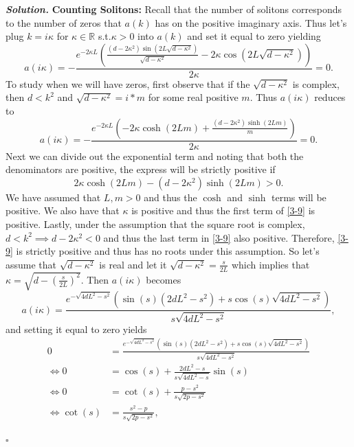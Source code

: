 \documentclass[12pt]{report}
\newenvironment{solution}[1][\it{Solution}]{\textbf{#1. } }{$\square$}
\def\R{{\mathbb R}}
\newcommand{\paren}[1]{{\left(#1\right)}} %
\begin{document}
\begin{solution}
    \noindent
    {\bf Counting Solitons:}
    Recall that the number of solitons corresponds to the number of zeros that $a(k)$ has on the positive imaginary axis. Thus let's plug $k = i\kappa$ for $\kappa \in \R$ s.t.$ \kappa > 0$ into $a(k)$ and set it equal to zero yielding 
    \[ 
        a(i\kappa) = -\frac{e^{-2 \kappa  L} \left(\frac{\left(d-2 \kappa ^2\right) \sin \left(2 L \sqrt{d-\kappa ^2}\right)}{\sqrt{d-\kappa ^2}}-2 \kappa  \cos \left(2 L \sqrt{d-\kappa ^2}\right)\right)}{2 \kappa } = 0.
    \]
    To study when we will have zeros, first observe that if the $\sqrt{d - \kappa^2}$ is complex, then $d < k^2$ and $\sqrt{d - \kappa^2} = i*m$ for some real positive $m$. Thus $a(i\kappa)$ reduces to
    \[ 
        a(i\kappa) = -\frac{e^{-2 \kappa  L} \left(-2 \kappa  \cosh (2 L m)+\frac{\left(d-2 \kappa ^2\right) \sinh (2 L m)}{m}\right)}{2 \kappa } = 0.
    \]
    Next we can divide out the exponential term and noting that both the denominators are positive, the express will be strictly positive if
    \begin{equation} \label{3-9}
        2 \kappa  \cosh (2 L m) - \left(d-2 \kappa ^2\right) \sinh (2 L m) > 0.
    \end{equation}
    We have assumed that $L,m>0$ and thus the $\cosh$ and $\sinh$ terms will be positive. We also have that $\kappa$ is positive and thus the first term of \ref{3-9} is positive. Lastly, under the assumption that the square root is complex, $d < k^2 \implies d-2 \kappa ^2 < 0$ and thus the last term in \ref{3-9} also positive. Therefore, \ref{3-9} is strictly positive and thus has no roots under this assumption. So let's assume that $\sqrt{d - \kappa^2}$ is real and let it $\sqrt{d - \kappa^2} = \frac{s}{2L}$ which implies that $\kappa = \sqrt{d - \paren{\frac{s}{2L}}^2}$. Then $a(i\kappa)$ becomes
    \[ 
        a(i\kappa) = \frac{e^{-\sqrt{4 d L^2-s^2}} \left(\sin (s) \left(2 d L^2-s^2\right)+s \cos (s) \sqrt{4 d L^2-s^2}\right)}{s \sqrt{4 d L^2-s^2}},
    \]
    and setting it equal to zero yields
    \begin{align*}
        0 &= \frac{e^{-\sqrt{4 d L^2-s^2}} \left(\sin (s) \left(2 d L^2-s^2\right)+s \cos (s) \sqrt{4 d L^2-s^2}\right)}{s \sqrt{4 d L^2-s^2}}\\
        \iff 0 &= \cos(s) + \frac{2dL^2 - s}{s\sqrt{4dL^2 - s}}\sin(s)\\
        \iff 0 &= \cot(s) + \frac{p - s^2}{s\sqrt{2p - s^2}}\\
        \iff \cot(s) &= \frac{s^2 - p}{s\sqrt{2p - s^2}},
    \end{align*}

\end{solution}
\end{document}
